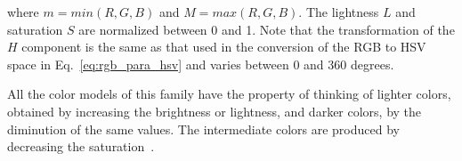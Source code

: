 \noindent where $m = min(R, G, B)$ and $M = max(R, G, B)$. The lightness $L$ and saturation $S$ are normalized between 0 and 1. Note that the transformation of the $H$ component is the same as that used in the conversion of the RGB to HSV space in Eq.~\ref{eq:rgb_para_hsv} and varies between 0 and 360 degrees.

All the color models of this family have the property of thinking of lighter colors, obtained by increasing the brightness or lightness, and darker colors, by the diminution of the same values. The intermediate colors are produced by decreasing the saturation~\citep{pedrini:08}.